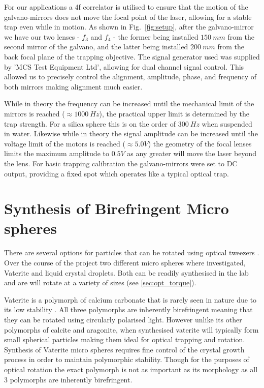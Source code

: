 For our applications a 4f correlator is utilised to ensure that the motion
of the galvano-mirrors does not move the focal point of the laser, allowing 
for a stable trap even while in motion. As shown in Fig.~\ref{fig:setup}, after
the galvano-mirror we have our two lenses - $f_3$ and $f_4$ - the former being 
installed $150\ mm$ from the second mirror of the galvano, and the latter being 
installed $200\ mm$ from the back focal plane of the trapping objective. The 
signal generator used was supplied by 'MCS Test Equipment Ltd', allowing for 
dual channel signal control. This allowed us to precisely control the alignment,
amplitude, phase, and frequency of both mirrors making alignment much easier. 

While in theory the frequency can be increased until the mechanical limit of the 
mirrors is reached ($\approx 1000\ Hz$), the practical upper limit is determined 
by the trap strength. For a silica sphere this is on the order of $300\ Hz$ when
suspended in water. Likewise while in theory the signal amplitude can be increased
until the voltage limit of the motors is reached ($\approx 5.0 V$) the geometry 
of the focal lenses limits the maximum amplitude to $0.5 V$ as any greater will
move the laser beyond the lens. For basic trapping calibration the galvano-mirrors 
were set to DC output, providing a fixed spot which operates like a typical optical 
trap.

\section{Synthesis of Birefringent Micro spheres}
\label{sec:vaterite}
There are several options for particles that can be rotated 
using optical tweezers \cite{Parkin2009, Saito2022}. Over 
the course of the project two different micro spheres where 
investigated, Vaterite and liquid crystal droplets. Both can 
be readily synthesised in the lab and are will rotate at a 
variety of sizes (see \ref{sec:opt_torque}).

Vaterite is a polymorph of calcium carbonate that is rarely 
seen in nature due to its low stability \cite{KonopackaLyskawa2019}. 
All three polymorphs are inherently birefringent meaning 
that they can be rotated using circularly polarised light. 
However unlike its other polymorphs of calcite and aragonite, 
when synthesised vaterite will typically form small spherical 
particles making them ideal for optical trapping and rotation. 
Synthesis of Vaterite micro spheres requires fine control of 
the crystal growth process in order to maintain polymorphic 
stability. Though for the purposes of optical rotation the 
exact polymorph is not as important as its morphology as all 
3 polymorphs are inherently birefringent. 

